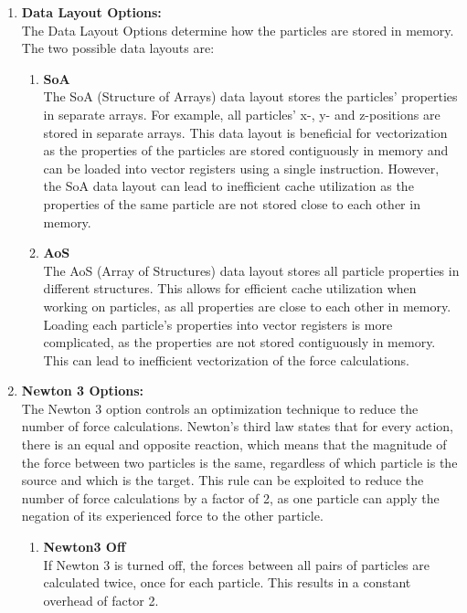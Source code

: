 \begin{enumerate}[label=\textbf{\arabic*.}]
\begin{enumerate}
            \end{enumerate}


      \item \textbf{Data Layout Options:} \\
            The Data Layout Options determine how the particles are stored in memory. The two possible data layouts are:
            \begin{enumerate}
                  \item \textbf{SoA} \\
                        The SoA (Structure of Arrays) data layout stores the particles' properties in separate arrays. For example, all particles' x-, y- and z-positions are stored in separate arrays. This data layout is beneficial for vectorization as the properties of the particles are stored contiguously in memory and can be loaded into vector registers using a single instruction. However, the SoA data layout can lead to inefficient cache utilization as the properties of the same particle are not stored close to each other in memory.

                  \item \textbf{AoS} \\
                        The AoS (Array of Structures) data layout stores all particle properties in different structures. This allows for efficient cache utilization when working on particles, as all properties are close to each other in memory.
                        Loading each particle's properties into vector registers is more complicated, as the properties are not stored contiguously in memory. This can lead to inefficient vectorization of the force calculations.
            \end{enumerate}

      \item \textbf{Newton 3 Options:} \\
            The Newton 3 option controls an optimization technique to reduce the number of force calculations. Newton's third law states that for every action, there is an equal and opposite reaction, which means that the magnitude of the force between two particles is the same, regardless of which particle is the source and which is the target. This rule can be exploited to reduce the number of force calculations by a factor of 2, as one particle can apply the negation of its experienced force to the other particle.
            \begin{enumerate}
                  \item \textbf{Newton3 Off} \\
                        If Newton 3 is turned off, the forces between all pairs of particles are calculated twice, once for each particle. This results in a constant overhead of factor 2.


\end{enumerate}
\end{enumerate}
